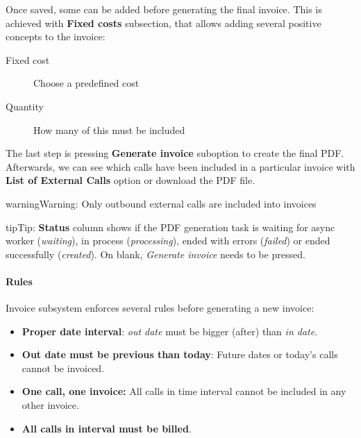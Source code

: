 \documentclass[letterpaper,10pt,english]{sphinxmanual}
\begin{document}
Once saved, some {\hyperref[administration_portal/brand/invoicing/invoice_schedulers:fixed\string-costs]{}} can be added before generating the final invoice. This is achieved with \textbf{Fixed costs}
subsection, that allows adding several positive concepts to the invoice:
\begin{description}
\item[{Fixed cost}] \leavevmode{}\label{administration_portal/brand/invoicing/invoices:term-fixed-cost}
Choose a predefined cost

\item[{Quantity}] \leavevmode{}\label{administration_portal/brand/invoicing/invoices:term-quantity}
How many of this must be included

\end{description}

The last step is pressing \textbf{Generate invoice} suboption to create the final PDF. Afterwards, we can see which calls have been
included in a particular invoice with \textbf{List of External Calls} option or download the PDF file.

\begin{notice}{warning}{Warning:}
Only outbound external calls are included into invoices
\end{notice}

\begin{notice}{tip}{Tip:}
\textbf{Status} column shows if the PDF generation task is waiting for async worker (\emph{waiting}), in process (\emph{processing}),
ended with errors (\emph{failed}) or ended successfully (\emph{created}). On blank, \emph{Generate invoice} needs to be pressed.
\end{notice}


\paragraph{Rules}
\label{administration_portal/brand/invoicing/invoices:rules}
Invoice subsystem enforces several rules before generating a new invoice:
\begin{itemize}
\item {} 
\textbf{Proper date interval}: \emph{out date} must be bigger (after) than \emph{in date}.

\item {} 
\textbf{Out date must be previous than today}: Future dates or today's calls cannot be invoiced.

\item {} 
\textbf{One call, one invoice:} All calls in time interval cannot be included in any other invoice.

\item {} 
\textbf{All calls in interval must be billed}.

\end{itemize}
\end{document}

